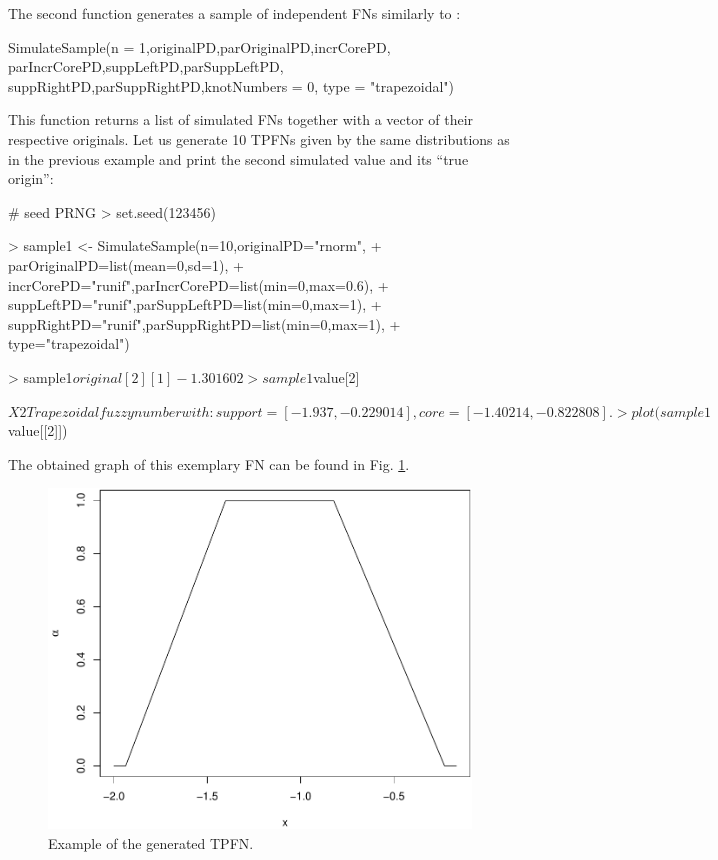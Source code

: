 The second function generates a sample of  independent FNs similarly to :
\begin{example}
SimulateSample(n = 1,originalPD,parOriginalPD,incrCorePD,
  parIncrCorePD,suppLeftPD,parSuppLeftPD,
  suppRightPD,parSuppRightPD,knotNumbers = 0,
  type = "trapezoidal")
\end{example}
This function returns a list of simulated FNs together with a vector of their respective originals.
Let us generate 10 TPFNs given by the same distributions as in the previous example and print the second simulated value and its ``true origin'':
\begin{example}
# seed PRNG
> set.seed(123456)

> sample1 <- SimulateSample(n=10,originalPD="rnorm",
+  parOriginalPD=list(mean=0,sd=1),
+  incrCorePD="runif",parIncrCorePD=list(min=0,max=0.6),
+  suppLeftPD="runif",parSuppLeftPD=list(min=0,max=1),
+  suppRightPD="runif",parSuppRightPD=list(min=0,max=1),
+  type="trapezoidal")

> sample1$original[2]

[1] -1.301602

> sample1$value[2]

$X2
Trapezoidal fuzzy number with:
   support=[-1.937,-0.229014],
      core=[-1.40214,-0.822808].
      
> plot(sample1$value[[2]])
\end{example}

The obtained graph of this exemplary FN can be found in Fig. \ref{figFN1}.

\begin{figure}[htb]
  \centering
	\includegraphics[scale=0.45]{fuzzy_number_rys1.pdf}
	\caption{Example of the generated TPFN.}
	\label{figFN1}
\end{figure}


